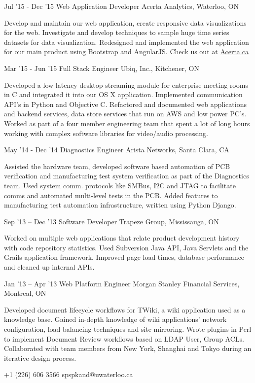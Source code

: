 \documentclass{tccv}
\begin{document}
\begin{eventlist}

\item{Jul '15 - Dec '15}
    {Web Application Developer}
    {Acerta Analytics, Waterloo, ON}

Develop and maintain our web application, create responsive data visualizations for the web. Investigate and develop techniques to sample huge time series datasets for data visualization. Redesigned and implemented the web application for our main product using Bootstrap and AngularJS. Check us out at \href{http://www.acerta.ca}{Acerta.ca}

\item{Mar '15 - Jun '15}
     {Full Stack Engineer}
     {Ubiq, Inc., Kitchener, ON}

Developed a low latency desktop streaming module for enterprise meeting rooms in C and integrated it into our OS X application. Implemented communication API's in Python and Objective C. Refactored and documented web applications and backend services, data store services that run on AWS and low power PC's. Worked as part of a four member engineering team that spent a lot of long hours working with complex software libraries for video/audio processing.

\item{May '14 - Dec '14}
     {Diagnostics Engineer}
     {Arista Networks, Santa Clara, CA}

Assisted the hardware team, developed software based automation of PCB verification and manufacturing test system verification as part of the Diagnostics team. Used system comm. protocols like SMBus, I2C and JTAG to facilitate comms and automated multi-level tests in the PCB. Added features to manufacturing test automation infrastructure, written using Python Django.

\item{Sep '13 -- Dec '13}
     {Software Developer}
     {Trapeze Group, Mississauga, ON}

Worked on multiple web applications that relate product development history with code repository statistics. Used Subversion Java API, Java Servlets and the Grails application framework. Improved page load times, database performance and cleaned up internal APIs.

\item{Jan '13 -- Apr '13}
     {Web Platform Engineer}
     {Morgan Stanley Financial Services, Montreal, ON}

Developed document lifecycle workflows for TWiki, a wiki application used as a knowledge base. Gained in-depth knowledge of wiki applications' network configuration, load balancing techniques and site mirroring. Wrote plugins in Perl to implement Document Review workflows based on LDAP User, Group ACLs. Collaborated with team members from New York, Shanghai and Tokyo during an iterative design process.

\end{eventlist}
    {+1 (226) 606 3566}
    {spspkand@uwaterloo.ca}
\end{document}
